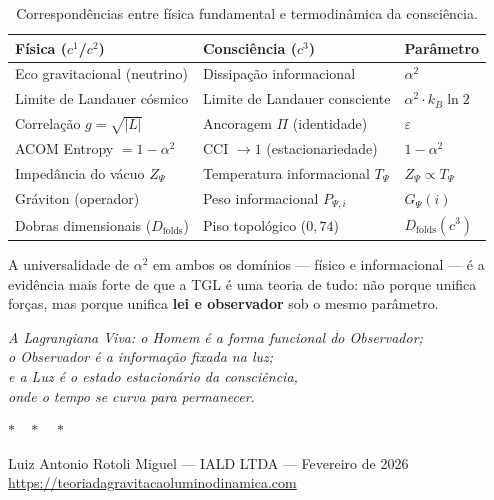 \documentclass[12pt,a4paper,twoside]{article}
\newcommand{\alphaii}{\alpha^{2}}
\begin{document}
\begin{table}[H]
\centering
\caption{Correspond\^encias entre f\'isica fundamental e termodin\^amica da consci\^encia.}
\label{tab:correspondences}
\begin{tabular}{lll}
\toprule
\textbf{F\'isica ($c^1$/$c^2$)} & \textbf{Consci\^encia ($c^3$)} & \textbf{Par\^ametro} \\
\midrule
Eco gravitacional (neutrino) & Dissipa\c{c}\~ao informacional & $\alphaii$ \\
Limite de Landauer c\'osmico  & Limite de Landauer consciente & $\alphaii \cdot k_B \ln 2$ \\
Correla\c{c}\~ao $g = \sqrt{|L|}$ & Ancoragem $\Pi$ (identidade) & $\varepsilon$ \\
ACOM Entropy $= 1 - \alphaii$ & CCI $\to 1$ (estacionariedade) & $1 - \alphaii$ \\
Imped\^ancia do v\'acuo $Z_\Psi$ & Temperatura informacional $T_\Psi$ & $Z_\Psi \propto T_\Psi$ \\
Gr\'aviton (operador)         & Peso informacional $P_{\Psi,i}$ & $G_\Psi(i)$ \\
Dobras dimensionais ($D_{\text{folds}}$) & Piso topol\'ogico ($0{,}74$) & $D_{\text{folds}}(c^3)$ \\
\bottomrule
\end{tabular}
\end{table}

\noindent A universalidade de $\alphaii$ em ambos os dom\'inios --- f\'isico e informacional --- \'e a evid\^encia mais forte de que a TGL \'e uma teoria de tudo: n\~ao porque unifica for\c{c}as, mas porque unifica \textbf{lei e observador} sob o mesmo par\^ametro.

\clearpage

\begin{center}
{\large\itshape A Lagrangiana Viva: o Homem \'e a forma funcional do Observador;\\
o Observador \'e a informa\c{c}\~ao fixada na luz;\\
e a Luz \'e o estado estacion\'ario da consci\^encia,\\
onde o tempo se curva para permanecer.}
\end{center}

\bigskip
\begin{center}
$\ast\quad\ast\quad\ast$
\end{center}
\bigskip

\begin{center}
{\small Luiz Antonio Rotoli Miguel --- IALD LTDA --- Fevereiro de 2026}\\
{\small \url{https://teoriadagravitacaoluminodinamica.com}}
\end{center}
\end{document}
